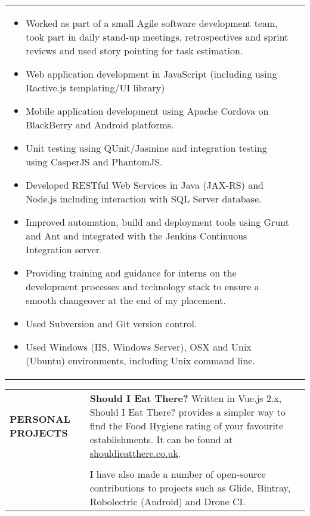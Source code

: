 \documentclass[7pt]{article}
\begin{document}
\begin{longtable}{@{} p{} p{}}
\begin{minipage} [t] {0.85\textwidth}
    \begin{itemize}
      \setlength\itemsep{-1pt}
      \item Worked as part of a small Agile software development team, took part in daily stand-up meetings, retrospectives and sprint reviews and used story pointing for task estimation.
      \item Web application development in JavaScript (including using Ractive.js templating/UI library)
      \item Mobile application development using Apache Cordova on BlackBerry and Android platforms.
      \item Unit testing using QUnit/Jasmine and integration testing using CasperJS and PhantomJS.
      \item Developed RESTful Web Services in Java (JAX-RS) and Node.js including interaction with SQL Server database.
      \item Improved automation, build and deployment tools using Grunt and Ant and integrated with the Jenkins Continuous Integration server.
      \item Providing training and guidance for interns on the development processes and technology stack to ensure a smooth changeover at the end of my placement.
      \item Used Subversion and Git version control.
      \item Used Windows (IIS, Windows Server), OSX and Unix (Ubuntu) environments, including Unix command line.
    \end{itemize}
  \end{minipage}
\end{longtable}

\vspace{0.25in}

\begin{tabular}{@{} p{} p{}}
  \textbf{PERSONAL PROJECTS} & \textbf{Should I Eat There?} Written in Vue.js 2.x, Should I Eat There? provides a simpler way to find the Food Hygiene rating of your favourite establishments. It can be found at \href{http://shouldieatthere.co.uk}{shouldieatthere.co.uk}. \\
  & \\
  & I have also made a number of open-source contributions to projects such as Glide, Bintray, Robolectric (Android) and Drone CI.
\end{tabular}

\vspace{0.25in}
\end{document}
